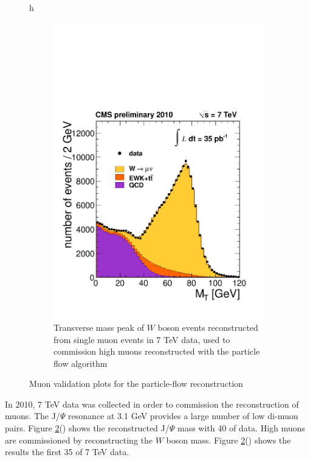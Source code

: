 \begin{figure}{h}
\begin{subfigure}[h]{0.40\textwidth}
        \includegraphics[width=\textwidth]{Figures/Reconstruction_Diagrams/MUO__Wmunu_35pb-1_lin.pdf}
        \caption{Transverse mass peak of $W$ boson events
          reconstructed from single muon events in 7 TeV data, used to
        commission high \PT muons reconstructed with the particle flow
      algorithm}\label{fig:muon_w_mass}
      \end{subfigure}
      \caption{Muon validation plots for the particle-flow reconstruction}\label{fig:muon_pf_validation}
\end{figure}

\par In 2010, 7 TeV data was collected \cite{CMS-PAS-PFT-10-003} in
order to commission the reconstruction of muons.  The J/$\Psi$
resonance at 3.1 GeV provides a large number of low \PT di-muon pairs.
Figure \ref{fig:muon_pf_validation}() shows
the reconstructed J/$\Psi$ mass with 40 \pbinv of data.  High \PT
muons are commissioned by reconstructing the $W$ boson mass.  Figure
\ref{fig:muon_pf_validation}() shows the
results the first 35 \pbinv of 7 TeV data.   


